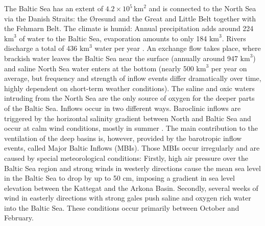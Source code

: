The Baltic Sea has an extent of $4.2 \times 10^{5} \, \text{km}^2$ 
\citep[][]{balticsea} and is connected to the North Sea via the Danish Straits: 
the \O resund and the Great and Little Belt together with the Fehmarn Belt. The 
climate is humid: Annual precipitation adds around 224 $\text{km}^3$ of water to 
the Baltic Sea, evaporation amounts to only 184 $\text{km}^3$. Rivers discharge 
a total of 436 $\text{km}^3$ water per year \citep[][]{reissmann2009}. An 
exchange flow takes place, where brackish water leaves the Baltic Sea near the 
surface (annually around 947 $\text{km}^3$) and saline North Sea water enters at 
the bottom (nearly 500 $\text{km}^3$ per year on average, but frequency and 
strength of inflow events differ dramatically over time, highly dependent on 
short-term weather conditions). The saline and oxic waters intruding from the 
North Sea are the only 
source of oxygen for the deeper parts of the Baltic Sea. Inflows occur in two 
different ways. Baroclinic inflows are triggered by the horizontal salinity 
gradient between North and Baltic Sea and occur at calm wind conditions, mostly 
in summer \citep[][]{reissmann2009}. The main contribution to the ventilation 
of the 
deep basins is, however, provided by the barotropic inflow events, called Major 
Baltic Inflows (MBIs). Those MBIs occur irregularly and are caused by special 
meteorological conditions: Firstly, high air pressure over the Baltic Sea 
region and strong winds in westerly directions cause the mean sea level in the 
Baltic Sea to drop by up to 50 cm, imposing a gradient in sea level elevation 
between the Kattegat and the Arkona Basin. Secondly, several weeks of wind in 
easterly 
directions with strong gales \citep[][]{balticsea, reissmann2009, mohrholz2015} 
push saline and oxygen rich water into the Baltic Sea. These conditions occur 
primarily between October and February. 

